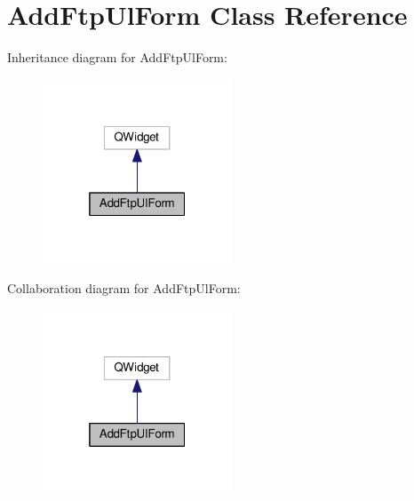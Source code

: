 \hypertarget{class_add_ftp_ul_form}{}\section{Add\+Ftp\+Ul\+Form Class Reference}
\label{class_add_ftp_ul_form}


Inheritance diagram for Add\+Ftp\+Ul\+Form\+:
\nopagebreak
\begin{figure}[H]
\begin{center}
\leavevmode
\includegraphics[width=160pt]{class_add_ftp_ul_form__inherit__graph}
\end{center}
\end{figure}


Collaboration diagram for Add\+Ftp\+Ul\+Form\+:
\nopagebreak
\begin{figure}[H]
\begin{center}
\leavevmode
\includegraphics[width=160pt]{class_add_ftp_ul_form__coll__graph}
\end{center}
\end{figure}
